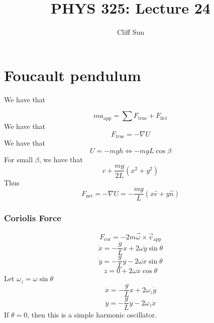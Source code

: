 \documentclass{article}
\title{PHYS 325: Lecture 24}
\author{Cliff Sun}
\newtheorem{one minute paper}[theorem]{One Minute Paper}
\begin{document}
\maketitle

\section*{Foucault pendulum}

We have that 

\begin{equation}
    ma_{\text{app}} = \sum F_{\text{true}} + F_{\text{fict}}
\end{equation}
We have that 
\begin{equation}
    F_{\text{true}} = -\nabla U
\end{equation}
We have that 
\begin{equation}
    U = -mgh \iff -mgL\cos\beta
\end{equation}
For small $\beta$, we have that 
\begin{equation}
    c + \frac{mg}{2L}(x^2 + y^2)
\end{equation}
Thus 
\begin{equation}
    F_{\text{net}} = -\nabla U = -\frac{mg}{L}(x\hat{e} + y\hat{n})
\end{equation}
\subsubsection*{Coriolis Force}
\begin{equation}
    F_{\text{cor}} = -2m\vec{\omega} \times \vec{v}_{\text{app}}
\end{equation}
\begin{equation}
    \ddot{x} = -\frac{g}{L}x + 2\omega \dot{y}\sin\theta
\end{equation}
\begin{equation}
    \ddot{y} = -\frac{g}{L}y - 2\omega\dot{x}\sin\theta
\end{equation}
\begin{equation}
    \ddot{z} = 0 + 2\omega \dot{x}\cos\theta 
\end{equation}
Let $\omega_z = \omega\sin\theta$
\begin{equation}
    \ddot{x} = -\frac{g}{L}x + 2\omega_z \dot{y}
\end{equation}
\begin{equation}
    \ddot{y} = -\frac{g}{L}y - 2\omega_z \dot{x}
\end{equation}
If $\theta = 0$, then this is a simple harmonic oscillator.     
\end{document}
